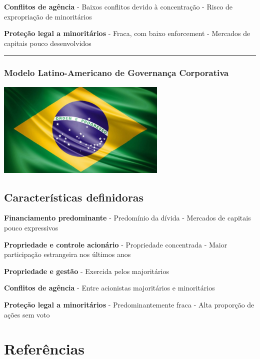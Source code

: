 \documentclass[
]{book}
\begin{document}
\textbf{Conflitos de agência} - Baixos conflitos devido à concentração - Risco de expropriação de minoritários

\textbf{Proteção legal a minoritários} - Fraca, com baixo enforcement - Mercados de capitais pouco desenvolvidos

\begin{center}\rule{0.5\linewidth}{0.5pt}\end{center}

\subsubsection{Modelo Latino-Americano de Governança Corporativa}\label{modelo-latino-americano-de-governanuxe7a-corporativa}

\includegraphics[width=3.1875in,height=\textheight]{images/02-2025-08-12_13/10-modelo_latino_americano.jpg}

\subsection{Características definidoras}\label{caracteruxedsticas-definidoras-4}

\textbf{Financiamento predominante} - Predomínio da dívida - Mercados de capitais pouco expressivos

\textbf{Propriedade e controle acionário} - Propriedade concentrada - Maior participação estrangeira nos últimos anos

\textbf{Propriedade e gestão} - Exercida pelos majoritários

\textbf{Conflitos de agência} - Entre acionistas majoritários e minoritários

\textbf{Proteção legal a minoritários} - Predominantemente fraca - Alta proporção de ações sem voto

\section{Referências}\label{referuxeancias}
\end{document}
